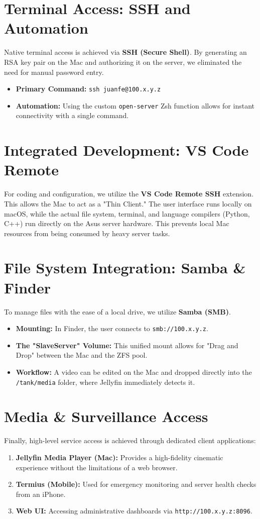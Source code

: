 \documentclass[12pt,a4paper,oneside]{book}
\begin{document}
\section{Terminal Access: SSH and Automation}
Native terminal access is achieved via \textbf{SSH (Secure Shell)}. By generating an RSA key pair on the Mac and authorizing it on the server, we eliminated the need for manual password entry. 
\begin{itemize}
    \item \textbf{Primary Command:} \texttt{ssh juanfe@100.x.y.z}
    \item \textbf{Automation:} Using the custom \texttt{open-server} Zsh function allows for instant connectivity with a single command.
\end{itemize}

\section{Integrated Development: VS Code Remote}
For coding and configuration, we utilize the \textbf{VS Code Remote SSH} extension. This allows the Mac to act as a "Thin Client." The user interface runs locally on macOS, while the actual file system, terminal, and language compilers (Python, C++) run directly on the Asus server hardware. This prevents local Mac resources from being consumed by heavy server tasks.

\section{File System Integration: Samba \& Finder}
To manage files with the ease of a local drive, we utilize \textbf{Samba (SMB)}.
\begin{itemize}
    \item \textbf{Mounting:} In Finder, the user connects to \texttt{smb://100.x.y.z}.
    \item \textbf{The "SlaveServer" Volume:} This unified mount allows for "Drag and Drop" between the Mac and the ZFS pool.
    \item \textbf{Workflow:} A video can be edited on the Mac and dropped directly into the \texttt{/tank/media} folder, where Jellyfin immediately detects it.
\end{itemize}

\section{Media & Surveillance Access}
Finally, high-level service access is achieved through dedicated client applications:
\begin{enumerate}
    \item \textbf{Jellyfin Media Player (Mac):} Provides a high-fidelity cinematic experience without the limitations of a web browser.
    \item \textbf{Termius (Mobile):} Used for emergency monitoring and server health checks from an iPhone.
    \item \textbf{Web UI:} Accessing administrative dashboards via \texttt{http://100.x.y.z:8096}.
\end{enumerate}
\end{document}
